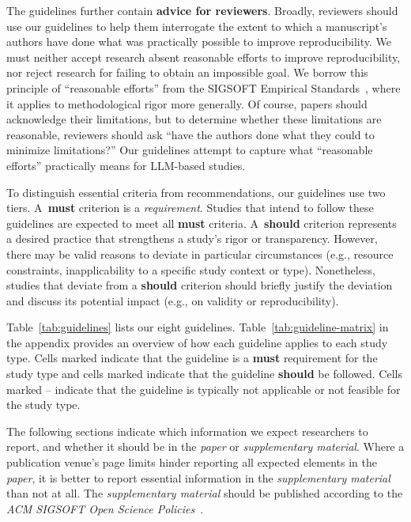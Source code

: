 \documentclass[smallextended]{svjour3}
\newif\ifpaper\papertrue
\newcommand{\must}{\textbf{must}\xspace}
\newcommand{\should}{\textbf{should}\xspace}
\newcommand{\paper}{\emph{paper}\xspace}
\newcommand{\supplementarymaterial}{\emph{supplementary material}\xspace}
\newcommand{\paper}{\emph{paper}\xspace}
\newcommand{\supplementarymaterial}{\emph{supplementary material}\xspace}
\newcommand{\iconM}{\usebox{\iconMbox}\xspace}
\newcommand{\iconS}{\usebox{\iconSbox}\xspace}
\newcommand{\iconM}{●\xspace}
\newcommand{\iconS}{○\xspace}
\begin{document}
The guidelines further contain \textbf{advice for reviewers}.
Broadly, reviewers should use our guidelines to help them interrogate the extent to which a manuscript's authors have done what was practically possible to improve reproducibility. We must neither accept research absent reasonable efforts to improve reproducibility, nor reject research for failing to obtain an impossible goal. We borrow this principle of ``reasonable efforts'' from the SIGSOFT Empirical Standards~\cite{ralph2021empiricalstandardssoftwareengineering}, where it applies to methodological rigor more generally. Of course, papers should acknowledge their limitations, but to determine whether these limitations are reasonable, reviewers should ask ``have the authors done what they could to minimize limitations?'' Our guidelines attempt to capture what ``reasonable efforts'' practically means for LLM-based studies.

To distinguish essential criteria from recommendations, our guidelines use two tiers.
A~\must criterion is a \emph{requirement}. Studies that intend to follow these
guidelines are expected to meet all \must criteria.
A~\should criterion represents a desired practice that strengthens a study's rigor or transparency.
However, there may be valid reasons to deviate in particular circumstances (e.g., resource constraints, inapplicability to a specific study context or type).
Nonetheless, studies that deviate from a \should criterion should briefly justify the
deviation and discuss its potential impact (e.g., on validity or reproducibility).
\ifpaper
Table~\ref{tab:guidelines} lists our eight guidelines.
Table~\ref{tab:guideline-matrix} in the appendix provides an overview of how each guideline applies to each study type.
Cells marked \iconM indicate that the guideline is a \must requirement for the study type and cells marked \iconS indicate that the guideline \should be followed.
Cells marked -- indicate that the guideline is typically not applicable or not feasible for the study type.
\fi

The following sections indicate which information we expect researchers to report, and whether it should be in the \paper or \supplementarymaterial. Where a publication venue's page limits hinder reporting all expected elements in the \paper, it is better to report essential information in the \supplementarymaterial than not at all.
The \supplementarymaterial should be published according to the \emph{ACM SIGSOFT Open Science Policies}~\citep{daniel_graziotin_2024_10796477}.
 
\end{document}

